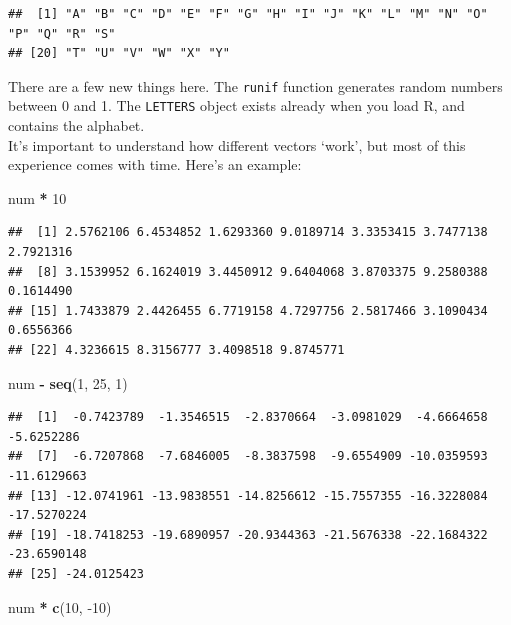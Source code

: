 \documentclass[
]{book}
\newenvironment{Shaded}{\begin{snugshade}}{\end{snugshade}}
\newcommand{\DecValTok}[1]{\textcolor[rgb]{0.00,0.00,0.81}{#1}}
\newcommand{\KeywordTok}[1]{\textcolor[rgb]{0.13,0.29,0.53}{\textbf{#1}}}
\newcommand{\NormalTok}[1]{#1}
\newcommand{\OperatorTok}[1]{\textcolor[rgb]{0.81,0.36,0.00}{\textbf{#1}}}
\newcommand{\StringTok}[1]{\textcolor[rgb]{0.31,0.60,0.02}{#1}}
\begin{document}
\begin{verbatim}
##  [1] "A" "B" "C" "D" "E" "F" "G" "H" "I" "J" "K" "L" "M" "N" "O" "P" "Q" "R" "S"
## [20] "T" "U" "V" "W" "X" "Y"
\end{verbatim}

There are a few new things here. The \texttt{runif} function generates random numbers
between 0 and 1. The \texttt{LETTERS} object exists already when you load R, and
contains the alphabet.\\

It's important to understand how different vectors `work', but most of this
experience comes with time. Here's an example:

\begin{Shaded}
\begin{Highlighting}[]
\NormalTok{num }\OperatorTok{*}\StringTok{ }\DecValTok{10}
\end{Highlighting}
\end{Shaded}

\begin{verbatim}
##  [1] 2.5762106 6.4534852 1.6293360 9.0189714 3.3353415 3.7477138 2.7921316
##  [8] 3.1539952 6.1624019 3.4450912 9.6404068 3.8703375 9.2580388 0.1614490
## [15] 1.7433879 2.4426455 6.7719158 4.7297756 2.5817466 3.1090434 0.6556366
## [22] 4.3236615 8.3156777 3.4098518 9.8745771
\end{verbatim}

\begin{Shaded}
\begin{Highlighting}[]
\NormalTok{num }\OperatorTok{-}\StringTok{ }\KeywordTok{seq}\NormalTok{(}\DecValTok{1}\NormalTok{, }\DecValTok{25}\NormalTok{, }\DecValTok{1}\NormalTok{)}
\end{Highlighting}
\end{Shaded}

\begin{verbatim}
##  [1]  -0.7423789  -1.3546515  -2.8370664  -3.0981029  -4.6664658  -5.6252286
##  [7]  -6.7207868  -7.6846005  -8.3837598  -9.6554909 -10.0359593 -11.6129663
## [13] -12.0741961 -13.9838551 -14.8256612 -15.7557355 -16.3228084 -17.5270224
## [19] -18.7418253 -19.6890957 -20.9344363 -21.5676338 -22.1684322 -23.6590148
## [25] -24.0125423
\end{verbatim}

\begin{Shaded}
\begin{Highlighting}[]
\NormalTok{num }\OperatorTok{*}\StringTok{ }\KeywordTok{c}\NormalTok{(}\DecValTok{10}\NormalTok{, }\DecValTok{-10}\NormalTok{)}
\end{Highlighting}
\end{Shaded}
\end{document}

